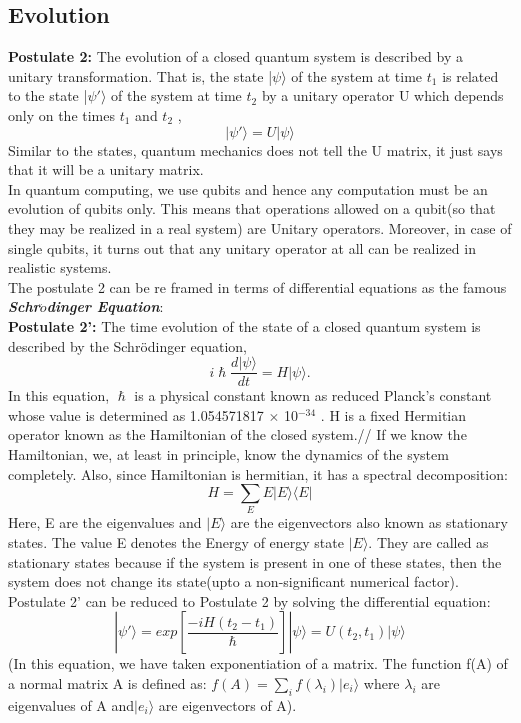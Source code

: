 \subsection{Evolution}
{\bf Postulate 2: } The evolution of a closed quantum system is described by a unitary transformation. That is, the state |$\psi\rangle$ of the system at time $t_1$ is related to the state |$\psi ' \rangle$ of the system at time $t_2$ by a unitary operator U which depends only on the times $t_1$ and $t_2$ ,
\begin{equation}
|\psi'\rangle = U|\psi\rangle
\end{equation}Similar to the states, quantum mechanics does not tell the U matrix, it just says that it will be a unitary matrix. \\
In quantum computing, we use qubits and hence any computation must be an evolution of qubits only. This means that operations allowed on a qubit(so that they may be realized in a real system) are Unitary operators. Moreover, in case of single qubits, it turns out that any unitary operator at all can be realized in realistic systems. \\
The postulate 2 can be re framed in terms of differential equations as the famous {\it \bf Schr$\ddot{o}$dinger Equation}:\\
{\bf Postulate 2': } The time evolution of the state of a closed quantum system is described by the Schrödinger equation,\\
\begin{equation}
i {\hslash}\frac{d|\psi\rangle}{dt}
= H|\psi\rangle.
\end{equation}
In this equation, $\hslash$ is a physical constant known as reduced Planck’s constant whose value is  determined as 1.054571817 $\times$ 10$^{-34}$ . H is a fixed Hermitian operator known as the Hamiltonian of the closed system.//
If we know the Hamiltonian, we, at least in principle, know the dynamics of the system completely. Also, since Hamiltonian is hermitian, it has a spectral decomposition:\\
\begin{equation}
H = \sum _EE|E\rangle\langle E|
\end{equation}Here, E are the eigenvalues and $|E\rangle$ are the eigenvectors also known as stationary states. The value E denotes the Energy of energy state $|E\rangle$. They are called as stationary states because if the system is present in one of these states, then the system does not change its state(upto a non-significant numerical factor).\\
Postulate 2' can be reduced to Postulate 2 by solving the differential equation:
\begin{equation}
|\psi'\rangle = exp[\frac{-iH(t_2-t_1)}{\hslash}] |\psi\rangle = U(t_2,t_1) |\psi\rangle
\end{equation}(In this equation, we have taken exponentiation of a matrix. The function f(A) of a normal matrix A is defined as: $f(A) = \sum_i f(\lambda_i) |e_i \rangle$ where $\lambda_i$ are eigenvalues of A and$|e_i \rangle$ are eigenvectors of A).\\ 
